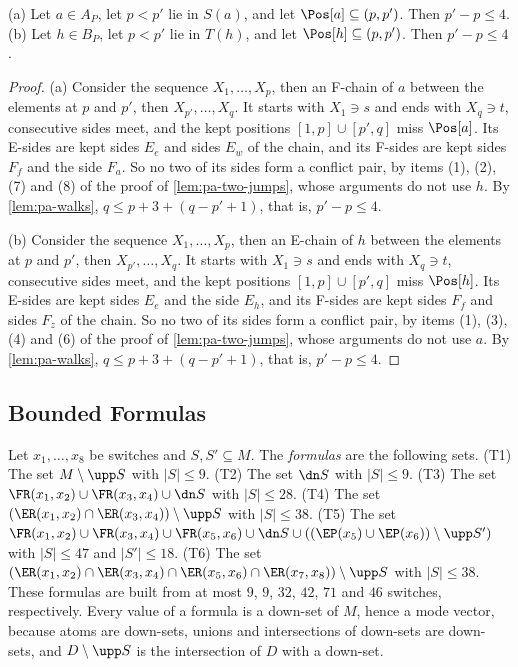 \begin{lemma}
\label{lem:pa-one-jump}
(a) Let $a \in A_P$, let $p < p'$ lie in $S(a)$, and let $\Pos[a] \subseteq (p, p')$.
Then $p' - p \leq 4$.
(b) Let $h \in B_P$, let $p < p'$ lie in $T(h)$, and let $\Pos[h] \subseteq (p, p')$.
Then $p' - p \leq 4$.
\end{lemma}

\begin{proof}
(a) Consider the sequence $X_1, \dots, X_p$, then an F-chain of $a$ between the elements at $p$ and $p'$, then $X_{p'}, \dots, X_q$.
It starts with $X_1 \ni s$ and ends with $X_q \ni t$, consecutive sides meet, and the kept positions $[1, p] \cup [p', q]$ miss $\Pos[a]$.
Its E-sides are kept sides $E_e$ and sides $E_w$ of the chain, and its F-sides are kept sides $F_f$ and the side $F_a$.
So no two of its sides form a conflict pair, by items (1), (2), (7) and (8) of the proof of \cref{lem:pa-two-jumps}, whose arguments do not use $h$.
By \cref{lem:pa-walks}, $q \leq p + 3 + (q - p' + 1)$, that is, $p' - p \leq 4$.

(b) Consider the sequence $X_1, \dots, X_p$, then an E-chain of $h$ between the elements at $p$ and $p'$, then $X_{p'}, \dots, X_q$.
It starts with $X_1 \ni s$ and ends with $X_q \ni t$, consecutive sides meet, and the kept positions $[1, p] \cup [p', q]$ miss $\Pos[h]$.
Its E-sides are kept sides $E_e$ and the side $E_h$, and its F-sides are kept sides $F_f$ and sides $F_z$ of the chain.
So no two of its sides form a conflict pair, by items (1), (3), (4) and (6) of the proof of \cref{lem:pa-two-jumps}, whose arguments do not use $a$.
By \cref{lem:pa-walks}, $q \leq p + 3 + (q - p' + 1)$, that is, $p' - p \leq 4$.
\end{proof}

\subsection{Bounded Formulas}
\label{sec:pa-formulas}

\begin{definition}[Formulas]
\label{def:pa-formulas}
Let $x_1, \dots, x_8$ be switches and $S, S' \subseteq M$.
The \emph{formulas} are the following sets.
(T1) The set $M \setminus \upp S$ with $|S| \leq 9$.
(T2) The set $\dn S$ with $|S| \leq 9$.
(T3) The set $\FR(x_1, x_2) \cup \FR(x_3, x_4) \cup \dn S$ with $|S| \leq 28$.
(T4) The set $(\ER(x_1, x_2) \cap \ER(x_3, x_4)) \setminus \upp S$ with $|S| \leq 38$.
(T5) The set $\FR(x_1, x_2) \cup \FR(x_3, x_4) \cup \FR(x_5, x_6) \cup \dn S \cup ((\EP(x_5) \cup \EP(x_6)) \setminus \upp S')$ with $|S| \leq 47$ and $|S'| \leq 18$.
(T6) The set $(\ER(x_1, x_2) \cap \ER(x_3, x_4) \cap \ER(x_5, x_6) \cap \ER(x_7, x_8)) \setminus \upp S$ with $|S| \leq 38$.
These formulas are built from at most $9$, $9$, $32$, $42$, $71$ and $46$ switches, respectively.
Every value of a formula is a down-set of $M$, hence a mode vector, because atoms are down-sets, unions and intersections of down-sets are down-sets, and $D \setminus \upp S$ is the intersection of $D$ with a down-set.
\end{definition}

